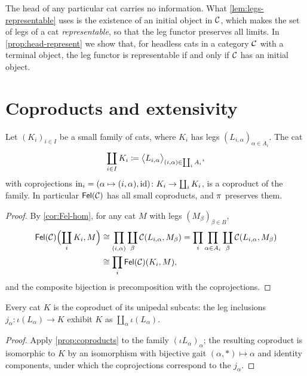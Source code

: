 \begin{remark}\label{rem:head-detects}
The head of any particular cat carries no information. What
\cref{lem:legs-representable} uses is the existence of an initial object in
$\mathcal{C}$, which makes the set of legs of a cat \emph{representable}, so that the
leg functor preserves all limits. In \cref{prop:head-represent} we show that,
for headless cats in a category $\mathcal{C}$ with a terminal object, the leg functor is
representable if and only if $\mathcal{C}$ has an initial object.
\end{remark}

\section{Coproducts and extensivity}\label{sec:coproducts}

\begin{proposition}\label{prop:coproducts}
Let $(K_i)_{i\in I}$ be a small family of cats, where $K_i$ has legs
$(L_{i,\alpha})_{\alpha\in A_i}$. The cat
\[
\coprod_{i\in I}K_i\coloneqq\bigl\langle L_{i,\alpha}\bigr\rangle_{(i,\alpha)\in\coprod_iA_i},
\]
with coprojections $\mathrm{in}_i=(\alpha\mapsto(i,\alpha),\mathrm{id})\colon K_i\to\coprod_iK_i$,
is a coproduct of the family. In particular $\mathsf{Fel}(\mathcal{C})$ has all small
coproducts, and $\pi$ preserves them.
\end{proposition}

\begin{proof}
By \cref{cor:Fel-hom}, for any cat $M$ with legs $(M_\beta)_{\beta\in B}$,
\begin{align*}
\mathsf{Fel}(\mathcal{C})\Bigl(\coprod_iK_i,M\Bigr)&\cong\prod_{(i,\alpha)}\coprod_\beta\mathcal{C}(L_{i,\alpha},M_\beta)
=\prod_i\prod_{\alpha\in A_i}\coprod_\beta\mathcal{C}(L_{i,\alpha},M_\beta)\\
&\cong\prod_i\mathsf{Fel}(\mathcal{C})(K_i,M),
\end{align*}
and the composite bijection is precomposition with the coprojections.
\end{proof}

\begin{corollary}\label{cor:leg-decomposition-preview}
Every cat $K$ is the coproduct of its unipedal subcats: the leg inclusions
$j_\alpha\colon\iota(L_\alpha)\to K$ exhibit $K$ as $\coprod_{\alpha}\iota(L_\alpha)$.
\end{corollary}

\begin{proof}
Apply \cref{prop:coproducts} to the family $(\iota L_\alpha)_\alpha$; the
resulting coproduct is isomorphic to $K$ by an isomorphism with bijective gait
$(\alpha,*)\mapsto\alpha$ and identity components, under which the
coprojections correspond to the $j_\alpha$.
\end{proof}

